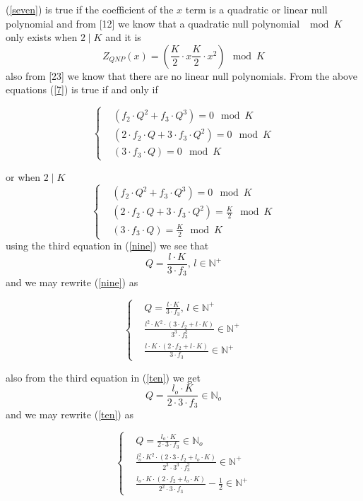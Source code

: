 \documentclass[fontsize=12pt]{article}
\newcommand{\cd}{\cdot}
\begin{document}
(\ref{seven}) is true if the coefficient of the $x$ term is a quadratic or linear null polynomial and from [12] we know that a quadratic null polynomial $\mod K$ only exists when $2\mid K$ and it is
\begin{equation}
Z_{QNP}(x) = (\frac{K}{2}\cdot x \frac{K}{2}\cdot x^2) \mod K
\end{equation}
also from [23] we know that there are no linear null polynomials. From the above equations (\ref{7}) is true if and only if


\begin{equation}
    \begin{cases}
      &(f_2\cdot Q^2 +f_3 \cdot Q^3) = 0 \mod K \\
      &(2\cdot f_2 \cdot Q +3\cdot f_3 \cdot Q^2) = 0 \mod K\\
      &(3\cdot f_3 \cdot Q)= 0 \mod K
    \end{cases}
    \label{nine}
  \end{equation}
  
  or when $2 \mid K$
  \begin{equation}
    \begin{cases}
      &(f_2\cdot Q^2 +f_3 \cdot Q^3) = 0 \mod K \\
      &(2\cdot f_2 \cdot Q +3\cdot f_3 \cdot Q^2) = \frac{K}{2} \mod K\\
      &(3\cdot f_3 \cdot Q)= \frac{K}{2} \mod K
    \end{cases}
    \label{ten}
  \end{equation}
   using the third equation in (\ref{nine}) we see that $$Q = \frac{l\cdot K}{3\cdot f_3}, \, l \in \mathbb{N}^+$$ 
   and we may rewrite (\ref{nine}) as 
   
   \begin{equation}
    \begin{cases}
      &Q = \frac{l\cdot K}{3\cdot f_3}, \, l \in \mathbb{N}^+\\
      &\frac{l^2\cdot K^2\cdot (3\cdot f_2 + l\cd K)}{3^3 \cd f_3^2} \in \mathbb{N}^+\\
      &\frac{l\cd K \cd (2 \cd f_2 + l \cd K)}{3\cd f_3} \in \mathbb{N}^+
    \end{cases}
    \label{eleven}
  \end{equation}
  
  also from the third equation in (\ref{ten}) we get
  $$ Q = \frac{l_o \cd K}{2 \cd 3 \cd f_3} \in \mathbb{N}_o $$
  and we may rewrite (\ref{ten}) as 
  
   \begin{equation}
    \begin{cases}
      &Q = \frac{l_o \cd K}{2 \cd 3 \cd f_3} \in \mathbb{N}_o\\
      &\frac{l_o^2\cdot K^2\cdot (2 \cd 3\cdot f_2 + l_o\cd K)}{2^3 \cd 3^3 \cd f_3^2} \in \mathbb{N}^+\\
      &\frac{l_o\cd K \cd (2 \cd f_2 + l_o \cd K)}{2^2 \cd 3\cd f_3}-\frac{1}{2} \in \mathbb{N}^+
    \end{cases}
    \label{twelve}
  \end{equation}
  
\end{document}
